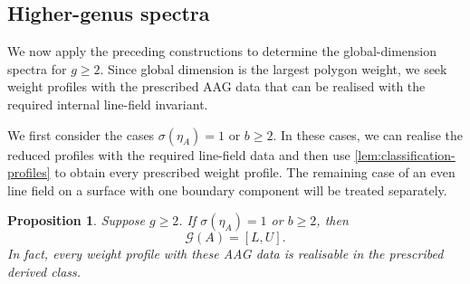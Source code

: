 \documentclass[11pt]{amsart}
\theoremstyle{definition}
\theoremstyle{plain}
\newtheorem{proposition}[proposition]{Proposition}
\theoremstyle{definition}
\theoremstyle{definition}
\newcommand{\GSpec}{\mathcal G}
\begin{document}
\subsection{Higher-genus spectra}
\label{subsec:classification-higher-genus}

We now apply the preceding constructions to determine
the global-dimension spectra for $g\geq2$. Since global
dimension is the largest polygon weight, we seek weight
profiles with the prescribed AAG data that can be realised
with the required internal line-field invariant.

We first consider the cases $\sigma(\eta_A)=1$ or $b\geq2$.
In these cases, we can realise the reduced profiles with
the required line-field data and then use
\cref{lem:classification-profiles} to obtain every prescribed
weight profile. The remaining case of an even line field
on a surface with one boundary component will be treated
separately.

\begin{proposition}
\label{prop:classification-higher-general}
Suppose $g\geq2$.  If $\sigma(\eta_A)=1$ or $b\geq2$, then
\[
 \GSpec(A)=[L,U].
\]
In fact, every weight profile with these AAG data is realisable in the
prescribed derived class.
\end{proposition}
\end{document}
